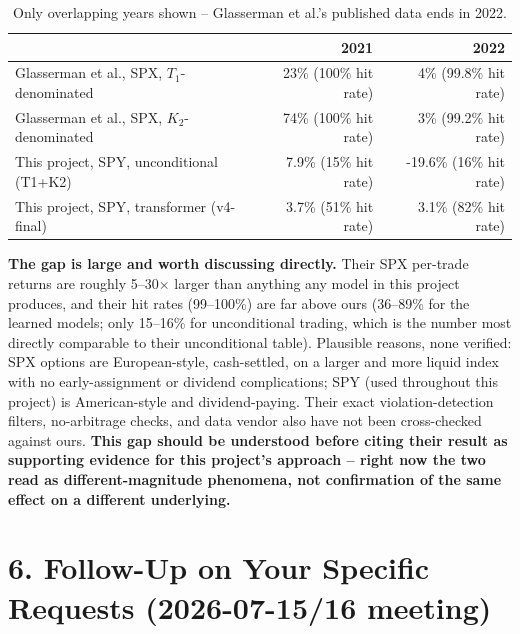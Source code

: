 \documentclass[11pt]{article}
\begin{document}
\begin{table}[H]
\centering
\small
\begin{tabular}{lrr}
\toprule
& 2021 & 2022 \\
\midrule
Glasserman et al., SPX, $T_1$-denominated & 23\% (100\% hit rate) & 4\% (99.8\% hit rate) \\
Glasserman et al., SPX, $K_2$-denominated & 74\% (100\% hit rate) & 3\% (99.2\% hit rate) \\
\midrule
This project, SPY, unconditional (T1+K2) & 7.9\% (15\% hit rate) & -19.6\% (16\% hit rate) \\
This project, SPY, transformer (v4-final) & 3.7\% (51\% hit rate) & 3.1\% (82\% hit rate) \\
\bottomrule
\end{tabular}
\caption{Only overlapping years shown -- Glasserman et al.'s published data ends in 2022.}
\end{table}
\textbf{The gap is large and worth discussing directly.} Their SPX per-trade returns are roughly
5--30$\times$ larger than anything any model in this project produces, and their hit rates (99--100\%) are
far above ours (36--89\% for the learned models; only 15--16\% for unconditional trading, which is the
number most directly comparable to their unconditional table). Plausible reasons, none verified: SPX options
are European-style, cash-settled, on a larger and more liquid index with no early-assignment or dividend
complications; SPY (used throughout this project) is American-style and dividend-paying. Their exact
violation-detection filters, no-arbitrage checks, and data vendor also have not been cross-checked against
ours. \textbf{This gap should be understood before citing their result as supporting evidence for this
project's approach -- right now the two read as different-magnitude phenomena, not confirmation of the same
effect on a different underlying.}

\section*{6. Follow-Up on Your Specific Requests (2026-07-15/16 meeting)}
\end{document}
